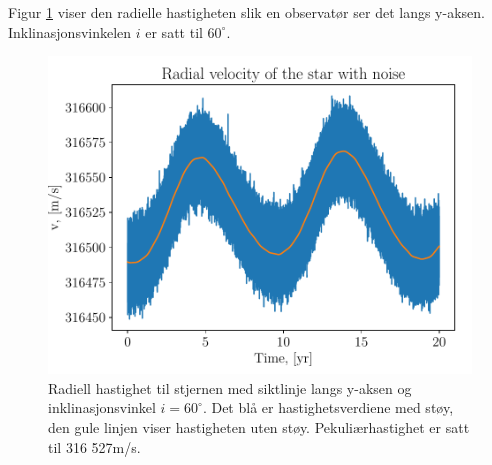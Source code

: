 \documentclass[reprint, english,notitlepage]{revtex4-1}  %
\begin{document}
Figur \ref{fig:rad_vel} viser den radielle hastigheten slik en observatør ser det langs y-aksen.
 Inklinasjonsvinkelen $i$ er satt til $60^{\circ}$.
\begin{figure}
  \includegraphics[width=\linewidth]{../output/plots/star_radial_vel.pdf}
  \caption{Radiell hastighet til stjernen med siktlinje langs y-aksen og inklinasjonsvinkel $i = 60^{\circ}$. Det blå er hastighetsverdiene med støy, den gule linjen viser hastigheten uten støy. Pekuliærhastighet er satt til 316 527m/s.}
  \label{fig:rad_vel}
\end{figure}
\end{document}
